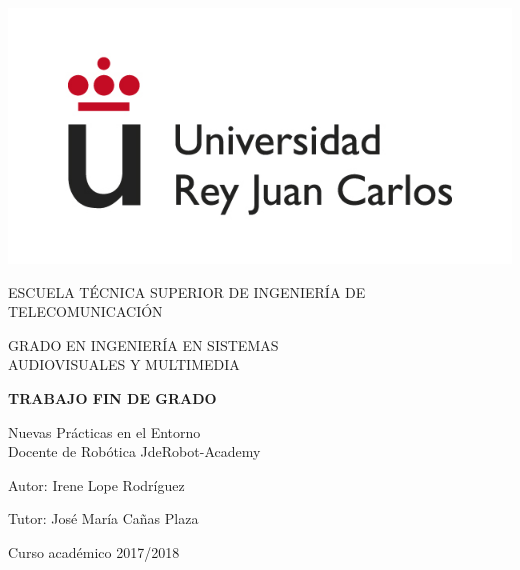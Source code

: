\begin{titlepage}
	\begin{center}
		\vspace*{3mm}
		\begin{center}
			\includegraphics[width=0.4\linewidth]{figures/logo.jpg}
		\end{center}
		\vspace{6.5mm}
		
		\fontsize{15.5}{14}\selectfont ESCUELA TÉCNICA SUPERIOR DE INGENIERÍA DE TELECOMUNICACIÓN
		\vspace{13mm}
		
		\fontsize{14}{14}\selectfont GRADO EN INGENIERÍA EN SISTEMAS \\ AUDIOVISUALES Y MULTIMEDIA
		
		\vspace{70pt}
		
		\fontsize{15.7}{14}\selectfont \textbf{TRABAJO FIN DE GRADO} 
		
		\vspace{25mm}
		\begin{huge}
			Nuevas Prácticas en el Entorno \\ \vspace{0.4cm} Docente de Robótica JdeRobot-Academy
		\end{huge}
		
		\vspace{25mm}
		
		\begin{large}
			Autor: Irene Lope Rodríguez
			
			Tutor: José María Cañas Plaza
			
			\vspace{10mm}
		\end{large}
		\begin{normalsize}
			Curso académico 2017/2018		
		\end{normalsize}
		\vspace{10mm}
		
	\end{center}
	
\end{titlepage}


